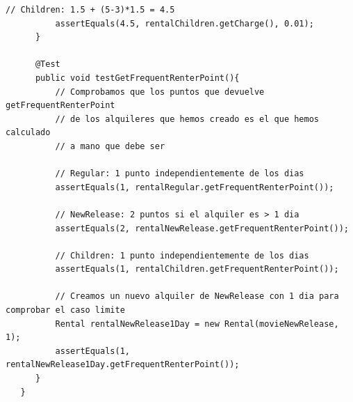 \begin{lstlisting}[caption={RentalTest.java}]
          // Children: 1.5 + (5-3)*1.5 = 4.5
          assertEquals(4.5, rentalChildren.getCharge(), 0.01);
      }
   
      @Test
      public void testGetFrequentRenterPoint(){
          // Comprobamos que los puntos que devuelve getFrequentRenterPoint
          // de los alquileres que hemos creado es el que hemos calculado
          // a mano que debe ser
          
          // Regular: 1 punto independientemente de los dias
          assertEquals(1, rentalRegular.getFrequentRenterPoint());
          
          // NewRelease: 2 puntos si el alquiler es > 1 dia
          assertEquals(2, rentalNewRelease.getFrequentRenterPoint());
          
          // Children: 1 punto independientemente de los dias
          assertEquals(1, rentalChildren.getFrequentRenterPoint());
          
          // Creamos un nuevo alquiler de NewRelease con 1 dia para comprobar el caso limite
          Rental rentalNewRelease1Day = new Rental(movieNewRelease, 1);
          assertEquals(1, rentalNewRelease1Day.getFrequentRenterPoint());
      }
   }
\end{lstlisting}

